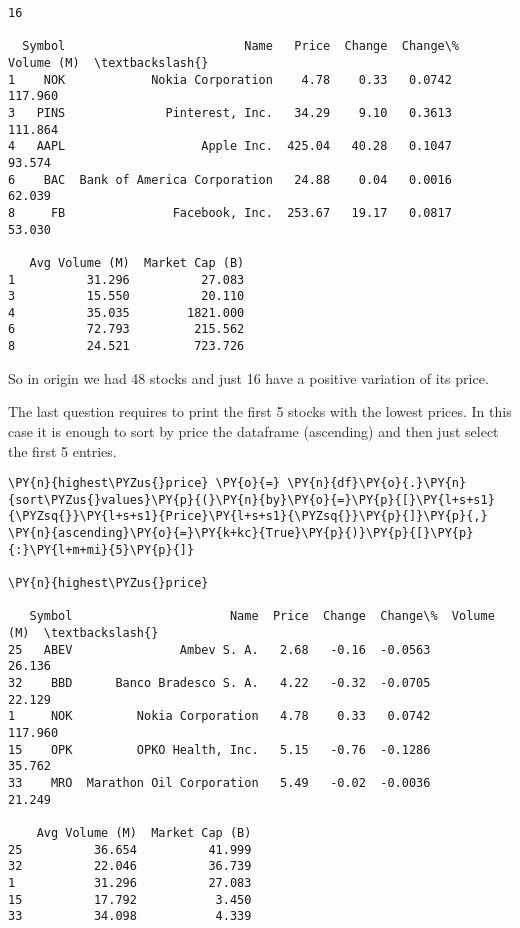 \begin{Answer}
\begin{tcolorbox}[size=fbox, boxrule=1pt, colback=cellbackground, colframe=cellborder]
\begin{Verbatim}[commandchars=\\\{\}]
16

  Symbol                         Name   Price  Change  Change\%  Volume (M)  \textbackslash{}
1    NOK            Nokia Corporation    4.78    0.33   0.0742     117.960
3   PINS              Pinterest, Inc.   34.29    9.10   0.3613     111.864
4   AAPL                   Apple Inc.  425.04   40.28   0.1047      93.574
6    BAC  Bank of America Corporation   24.88    0.04   0.0016      62.039
8     FB               Facebook, Inc.  253.67   19.17   0.0817      53.030

   Avg Volume (M)  Market Cap (B)
1          31.296          27.083
3          15.550          20.110
4          35.035        1821.000
6          72.793         215.562
8          24.521         723.726
\end{Verbatim}
\end{tcolorbox}
        
So in origin we had 48 stocks and just 16 have a positive variation of its price.

\Question
The last question requires to print the first 5 stocks with the lowest prices. In this case it is enough to sort by price the dataframe (ascending) and then just select the first 5 entries.

\begin{tcolorbox}[size=fbox, boxrule=1pt, colback=cellbackground, colframe=cellborder]
\begin{Verbatim}[commandchars=\\\{\}]
\PY{n}{highest\PYZus{}price} \PY{o}{=} \PY{n}{df}\PY{o}{.}\PY{n}{sort\PYZus{}values}\PY{p}{(}\PY{n}{by}\PY{o}{=}\PY{p}{[}\PY{l+s+s1}{\PYZsq{}}\PY{l+s+s1}{Price}\PY{l+s+s1}{\PYZsq{}}\PY{p}{]}\PY{p}{,} \PY{n}{ascending}\PY{o}{=}\PY{k+kc}{True}\PY{p}{)}\PY{p}{[}\PY{p}{:}\PY{l+m+mi}{5}\PY{p}{]}

\PY{n}{highest\PYZus{}price}

   Symbol                      Name  Price  Change  Change\%  Volume (M)  \textbackslash{}
25   ABEV               Ambev S. A.   2.68   -0.16  -0.0563      26.136
32    BBD      Banco Bradesco S. A.   4.22   -0.32  -0.0705      22.129
1     NOK         Nokia Corporation   4.78    0.33   0.0742     117.960
15    OPK         OPKO Health, Inc.   5.15   -0.76  -0.1286      35.762
33    MRO  Marathon Oil Corporation   5.49   -0.02  -0.0036      21.249

    Avg Volume (M)  Market Cap (B)
25          36.654          41.999
32          22.046          36.739
1           31.296          27.083
15          17.792           3.450
33          34.098           4.339
\end{Verbatim}
\end{tcolorbox}
\end{Answer}

